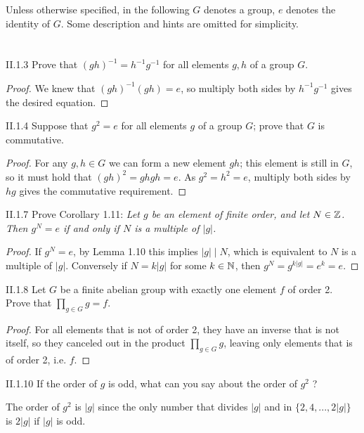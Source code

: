 Unless otherwise specified, in the following $G$ denotes a group, $e$ denotes the identity of $G$. Some description and hints are omitted for simplicity.

\section{}

\begin{problem}{II.1.3}
Prove that $(gh)^{-1} = h^{-1}g^{-1}$ for all elements $g,h$ of a group $G$.
\end{problem}
\begin{proof}
We knew that $(gh)^{-1} (gh) = e$, so multiply both sides by $h^{-1}g^{-1}$ gives the desired equation.
\end{proof}

\begin{problem}{II.1.4}
Suppose that $g^2 = e$ for all elements $g$ of a group $G$; prove that $G$ is commutative.
\end{problem}
\begin{proof}
For any $g,h \in G$ we can form a new element $gh$; this element is still in $G$, so it must hold that $(gh)^2 = ghgh = e$. As $g^2 = h^2 = e$, multiply both sides by $hg$ gives the commutative requirement.
\end{proof}

\begin{problem}{II.1.7}
Prove Corollary 1.11: \textit{Let $g$ be an element of finite order, and let $N \in \mathbb{Z}$. Then $g^N = e$ if and only if $N$ is a multiple of $|g|$.}
\end{problem}
\begin{proof}
If $g^N = e$, by Lemma 1.10 this implies $|g|\mid N$, which is equivalent to $N$ is a multiple of $|g|$. Conversely if $N = k|g|$ for some $k \in \mathbb{N}$, then $g^N = g^{k|g|} = e^k = e$.
\end{proof}

\begin{problem}{II.1.8}
Let $G$ be a finite abelian group with exactly one element $f$ of order 2. Prove that $\prod_{g \in G}g = f$.
\end{problem}
\begin{proof}
For all elements that is not of order 2, they have an inverse that is not itself, so they canceled out in the product $\prod_{g \in G}g$, leaving only elements that is of order 2, i.e. $f$.
\end{proof}

\begin{problem}{II.1.10}
If the order of $g$ is odd, what can you say about the order of $g^2$ ?
\end{problem}
\begin{solution}
The order of $g^2$ is $|g|$ since the only number that divides $|g|$ and in $\{2, 4, ..., 2|g|\}$ is $2|g|$ if $|g|$ is odd.
\end{solution}


